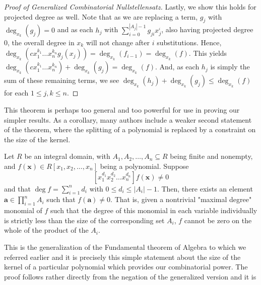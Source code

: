 \begin{proof}[Proof of Generalized Combinatorial Nullstellensatz]
Lastly, we show this holds for projected degree as well. Note that as we are replacing a term, \(g_{j}\) with \(\deg _{x_{k}} \left(  g_{j} \right) = 0	 \) and as each \(h_{j}\) with \(\sum_{i=0}^{\left| A_{j} \right|- 1 }g_{ji}x_{j}^{_{i}}\), also having projected degree \(0\), the overall degree in \(x_{k}\) will not change after \(i\) substitutions. Hence, \(\deg _{x_{k}} \left(  cx_1^{k_1}\ldots x_{n}^{k_{n}} g_{j}\left( x_{j} \right) \right) = \deg _{x_{k}} \left( f_{i-1} \right) = \deg _{x_{k}} \left( f\right)    \).
This yields \(\deg _{x_{k}} \left(cx_1^{k_1}\ldots x_{n}^{k_{n}} \right)  + \deg _{x_{k}} \left(g_{j} \right) = \deg _{x_{k}} \left(  f \right)  \). And, as each \(h_{j}\) is simply the sum of these remaining terms, we see \(\deg _{x_{k}} \left( h_{j} \right) + \deg _{x_{k}} \left( g_{j} \right)  \le \deg _{x_{k}} \left(  f \right)  \) for each \(1 \le j, k \le n\). \end{proof} This theorem is perhaps too general and too
powerful for use in proving our simpler results. As a corollary, many authors
include a weaker second statement of the theorem, where the splitting of a polynomial is replaced by a constraint on the size of the kernel.
\begin{theorem} Let
	$R$ be an integral domain, with $A_1, A_2, \ldots, A_n \subseteq R$ being
	finite and nonempty, and $f\left( \textbf{x} \right) \in R[x_1, x_2,
	\ldots, x_{n}]$ being a polynomial. Suppose \[ [x_1^{d_1}x_2^{d_2}\ldots
	x_{n}^{d_n}] f\left( \textbf{x} \right) \neq 0 \] and that $\deg f =
	\sum_{i=1}^{n} d_i$ with $0 \le d_i \le \left| A_i \right| -1$. Then,
	there exists an element\\ $ \textbf{a} \in \prod_{i= 1}^{n} A_i $ such
	that $f\left( \textbf{a} \right) \neq 0$. That is, given a nontrivial
	"maximal degree" monomial of $f$ such that the degree of this monomial
	in each variable individually is strictly less than the size of the
	corresponding set $A_i$, $f$ cannot be zero on the whole of the product
	of the $A_i$.  \end{theorem} This is the generalization of the
	Fundamental theorem of Algebra to which we referred earlier and it is
	precisely this simple statement about the size of the kernel of a
	particular polynomial which provides our combinatorial power. The proof
	follows rather directly from the negation of the generalized version and it is
